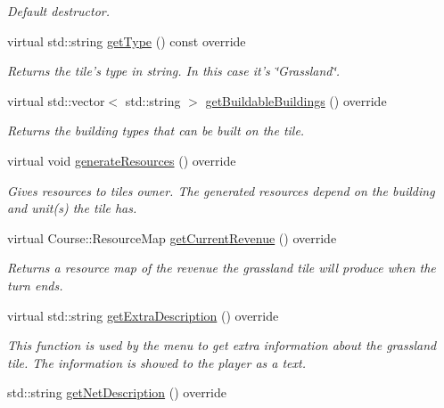 \begin{DoxyCompactItemize}
\begin{DoxyCompactList}\small\item\em Default destructor. \end{DoxyCompactList}\item 
virtual std\-::string \hyperlink{class_course_1_1_grassland_a0a652bbecdda0216613dad980936e30e}{get\-Type} () const override
\begin{DoxyCompactList}\small\item\em Returns the tile's type in string. In this case it's \char`\"{}\-Grassland\char`\"{}. \end{DoxyCompactList}\item 
virtual std\-::vector$<$ std\-::string $>$ \hyperlink{class_course_1_1_grassland_ac3238ab8e0f1c406ad4d97abee6f3af2}{get\-Buildable\-Buildings} () override
\begin{DoxyCompactList}\small\item\em Returns the building types that can be built on the tile. \end{DoxyCompactList}\item 
virtual void \hyperlink{class_course_1_1_grassland_a1a01ba1c5cc9b8f1e1ef035d4791b2ea}{generate\-Resources} () override
\begin{DoxyCompactList}\small\item\em Gives resources to tiles owner. The generated resources depend on the building and unit(s) the tile has. \end{DoxyCompactList}\item 
virtual Course\-::\-Resource\-Map \hyperlink{class_course_1_1_grassland_a241566bcfa3ed33594c1030fd1f328f2}{get\-Current\-Revenue} () override
\begin{DoxyCompactList}\small\item\em Returns a resource map of the revenue the grassland tile will produce when the turn ends. \end{DoxyCompactList}\item 
virtual std\-::string \hyperlink{class_course_1_1_grassland_a00e31cba040bf89daf5d306396638cf4}{get\-Extra\-Description} () override
\begin{DoxyCompactList}\small\item\em This function is used by the menu to get extra information about the grassland tile. The information is showed to the player as a text. \end{DoxyCompactList}\item 
std\-::string \hyperlink{class_course_1_1_grassland_a29381c9984060b969e187ed584fcd5b2}{get\-Net\-Description} () override

\end{DoxyCompactItemize}
